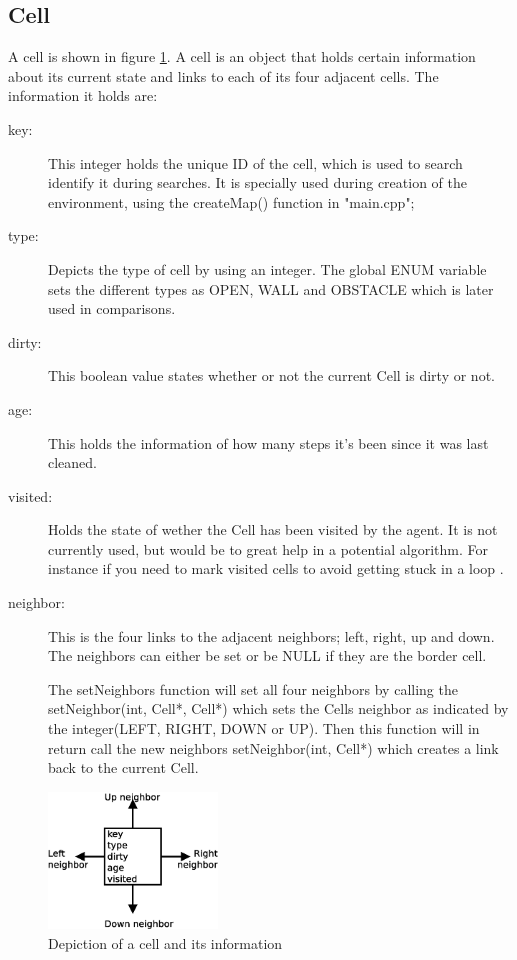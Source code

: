 \subsection{Cell}
A cell is shown in figure \ref{fig:cell}. A cell is an object that holds
certain information about its current state and links to each of its four
adjacent cells.  The information it holds are:
\begin{description}
\item[key:] 
This integer holds the unique ID of the cell, which is used to search identify 
it during searches. It is specially used during creation of the environment, 
using the createMap() function in "main.cpp";

\item[type:]
Depicts the type of cell by using an integer.  The global ENUM variable sets the
different types as OPEN, WALL and OBSTACLE which is later used in comparisons.

\item[dirty:]
This boolean value states whether or not the current Cell is dirty or not.

\item[age:]
This holds the information of how many steps it's been since it was last
cleaned.

\item[visited:]
Holds the state of wether the Cell has been visited by the agent. It is not
currently used, but would be to great help in a potential algorithm. For
instance if you need to mark visited cells to avoid getting stuck in a loop .

\item[neighbor:]
This is the four links to the adjacent neighbors; left, right, up and down. The
neighbors can either be set or be NULL if they are the border cell.

The setNeighbors function will set all four neighbors by calling the
setNeighbor(int, Cell*, Cell*) which sets the Cells neighbor as indicated by the
integer(LEFT, RIGHT, DOWN or UP).  Then this function will in return call the
new neighbors setNeighbor(int, Cell*) which creates a link back to the current
Cell.
\end{description}

\begin{figure}[h] \label{fig:cell}	\centering
\includegraphics[width=0.4\textwidth]{cell}
\caption{Depiction of a cell and its information}
\end{figure}


